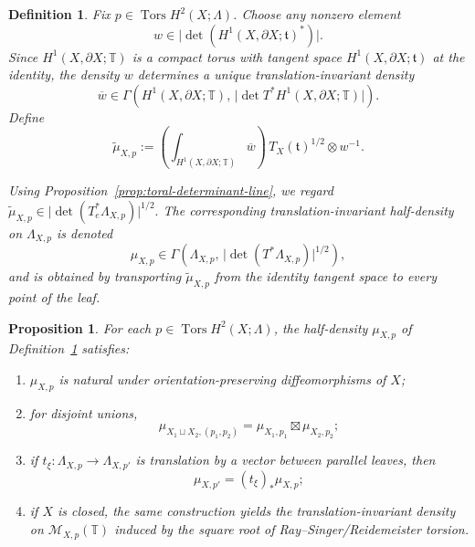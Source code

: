 \documentclass[10pt,a4paper]{amsart}
\newtheorem{prop}{Proposition}
\newtheorem{definition}{Definition}
\DeclareMathOperator{\Tors}{Tors}
\begin{document}
\begin{definition}
\label{def:Componentwise-half-density}
Fix $p\in \operatorname{Tors}H^2(X;\Lambda)$. Choose any nonzero element
\[
w\in \bigl|\det(H^1(X,\partial X;\mathfrak t)^*)\bigr|.
\]
Since $H^1(X,\partial X;\mathbb T)$ is a compact torus with tangent space
$H^1(X,\partial X;\mathfrak t)$ at the identity, the density $w$ determines a unique translation-invariant
density
\[
\overline{w}\in \Gamma\!\left(
H^1(X,\partial X;\mathbb T),\,
\bigl|\det T^* H^1(X,\partial X;\mathbb T)\bigr|
\right).
\]
Define
\begin{equation}
\label{eq:mu-tilde-definition}
\widetilde{\mu}_{X,p}
:=
\left(\int_{H^1(X,\partial X;\mathbb T)} \overline{w}\right)\,
T_X(\mathfrak t)^{1/2}\otimes w^{-1}.
\end{equation}

Using Proposition~\ref{prop:toral-determinant-line}, we regard $\widetilde{\mu}_{X,p}\in \bigl|\det(T_e^*\Lambda_{X,p})\bigr|^{1/2}.$ The corresponding translation-invariant half-density on $\Lambda_{X,p}$ is denoted
\[
\mu_{X,p}\in
\Gamma\!\left(
\Lambda_{X,p},\,
\bigl|\det(T^*\Lambda_{X,p})\bigr|^{1/2}
\right),
\]
and is obtained by transporting $\widetilde{\mu}_{X,p}$ from the identity tangent space to every point
of the leaf.
\end{definition}

\begin{prop}
\label{prop:Componentwise-toral-torsion-half-density}
For each $p\in\Tors H^2(X;\Lambda)$, the half-density $\mu_{X,p}$ of
Definition~\ref{def:Componentwise-half-density} satisfies:

\begin{enumerate}
\item[\textup{(i)}]
$\mu_{X,p}$ is natural under orientation-preserving diffeomorphisms of $X$;

\item[\textup{(ii)}]
for disjoint unions,
\[
\mu_{X_1\sqcup X_2,(p_1,p_2)}
=
\mu_{X_1,p_1}\boxtimes \mu_{X_2,p_2};
\]

\item[\textup{(iii)}]
if $t_\xi:\Lambda_{X,p}\to\Lambda_{X,p'}$ is translation by a vector between
parallel leaves, then
\[
\mu_{X,p'}=(t_\xi)_*\mu_{X,p};
\]

\item[\textup{(iv)}]
if $X$ is closed, the same construction yields the translation-invariant
density on $\mathcal M_{X,p}(\mathbb T)$ induced by the square root of
Ray--Singer/Reidemeister torsion.
\end{enumerate}
\end{prop}
\end{document}
